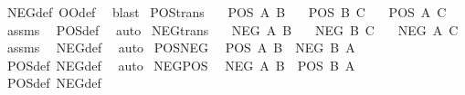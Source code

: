 \begin{isabellebody}
%
\isatagproof
{}\isamarkupfalse%
\ NEG{\isacharunderscore}{\kern0pt}def\ OO{\isacharunderscore}{\kern0pt}def\ \isamarkupfalse%
\ blast%
\endisatagproof
{\isafoldproof}%
%
\isadelimproof
\isanewline
%
\endisadelimproof
\isanewline
{}\isamarkupfalse%
\ POS{\isacharunderscore}{\kern0pt}trans{\isacharcolon}{\kern0pt}\isanewline
\ \ \ {\isachardoublequoteopen}POS\ A\ B{\isachardoublequoteclose}\isanewline
\ \ \ {\isachardoublequoteopen}POS\ B\ C{\isachardoublequoteclose}\isanewline
\ \ \ {\isachardoublequoteopen}POS\ A\ C{\isachardoublequoteclose}\isanewline
%
\isadelimproof
%
\endisadelimproof
%
\isatagproof
{}\isamarkupfalse%
\ assms\ \isamarkupfalse%
\ POS{\isacharunderscore}{\kern0pt}def\ \isamarkupfalse%
\ auto%
\endisatagproof
{\isafoldproof}%
%
\isadelimproof
\isanewline
%
\endisadelimproof
\isanewline
{}\isamarkupfalse%
\ NEG{\isacharunderscore}{\kern0pt}trans{\isacharcolon}{\kern0pt}\isanewline
\ \ \ {\isachardoublequoteopen}NEG\ A\ B{\isachardoublequoteclose}\isanewline
\ \ \ {\isachardoublequoteopen}NEG\ B\ C{\isachardoublequoteclose}\isanewline
\ \ \ {\isachardoublequoteopen}NEG\ A\ C{\isachardoublequoteclose}\isanewline
%
\isadelimproof
%
\endisadelimproof
%
\isatagproof
{}\isamarkupfalse%
\ assms\ \isamarkupfalse%
\ NEG{\isacharunderscore}{\kern0pt}def\ \isamarkupfalse%
\ auto%
\endisatagproof
{\isafoldproof}%
%
\isadelimproof
\isanewline
%
\endisadelimproof
\isanewline
{}\isamarkupfalse%
\ POS{\isacharunderscore}{\kern0pt}NEG{\isacharcolon}{\kern0pt}\isanewline
\ \ {\isachardoublequoteopen}POS\ A\ B\ {\isasymequiv}\ NEG\ B\ A{\isachardoublequoteclose}\isanewline
%
\isadelimproof
\ \ %
\endisadelimproof
%
\isatagproof
{}\isamarkupfalse%
\ POS{\isacharunderscore}{\kern0pt}def\ NEG{\isacharunderscore}{\kern0pt}def\ \isamarkupfalse%
\ auto%
\endisatagproof
{\isafoldproof}%
%
\isadelimproof
\isanewline
%
\endisadelimproof
\isanewline
{}\isamarkupfalse%
\ NEG{\isacharunderscore}{\kern0pt}POS{\isacharcolon}{\kern0pt}\isanewline
\ \ {\isachardoublequoteopen}NEG\ A\ B\ {\isasymequiv}\ POS\ B\ A{\isachardoublequoteclose}\isanewline
%
\isadelimproof
\ \ %
\endisadelimproof
%
\isatagproof
{}\isamarkupfalse%
\ POS{\isacharunderscore}{\kern0pt}def\ NEG{\isacharunderscore}{\kern0pt}def\ \isamarkupfalse%

\end{isabellebody}

